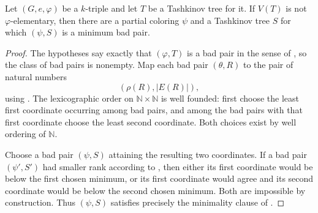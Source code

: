 \begin{lemma}
Let \((G,e,\varphi)\) be a \(k\)-triple and let \(T\) be a Tashkinov
tree for it.  If \(V(T)\) is not \(\varphi\)-elementary, then there are a
partial coloring \(\psi\) and a Tashkinov tree \(S\) for which
\((\psi,S)\) is a minimum bad pair.
\end{lemma}
\begin{proof}
The hypotheses say exactly that \((\varphi,T)\) is a bad pair in the sense
of , so the class of bad pairs is nonempty.  Map
each bad pair \((\theta,R)\) to the pair of natural numbers
\[
  (\rho(R),|E(R)|),
\]
using .  The lexicographic order on
\(\mathbb N\times\mathbb N\) is well founded: first choose the least first
coordinate occurring among bad pairs, and among the bad pairs with that
first coordinate choose the least second coordinate.  Both choices exist
by well ordering of \(\mathbb N\).

Choose a bad pair \((\psi,S)\) attaining the resulting two coordinates.
If a bad pair \((\psi',S')\) had smaller rank according to
, then either its first coordinate would be below
the first chosen minimum, or its first coordinate would agree and its
second coordinate would be below the second chosen minimum.  Both are
impossible by construction.  Thus \((\psi,S)\) satisfies precisely the
minimality clause of .
\end{proof}
